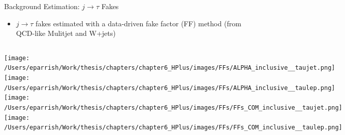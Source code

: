 \documentclass[aspectratio=169,xcolor=table]{beamer}
\begin{document}
\begin{frame}[t]{Background Estimation: $j \rightarrow \tau$ Fakes}
    \begin{itemize}
      \item $j \rightarrow \tau$ fakes estimated with a data-driven fake factor (FF) method (from QCD-like Mulitjet and W+jets)
      \begin{itemize}
      \end{itemize}
    \end{itemize}

    \begin{columns}
      \centering
        \texttt{[image: /Users/eparrish/Work/thesis/chapters/chapter6\_HPlus/images/FFs/ALPHA\_inclusive\_\_taujet.png]}
      \centering
        \texttt{[image: /Users/eparrish/Work/thesis/chapters/chapter6\_HPlus/images/FFs/ALPHA\_inclusive\_\_taulep.png]}
      \centering
        \texttt{[image: /Users/eparrish/Work/thesis/chapters/chapter6\_HPlus/images/FFs/FFs\_COM\_inclusive\_\_taujet.png]}
      \centering
        \texttt{[image: /Users/eparrish/Work/thesis/chapters/chapter6\_HPlus/images/FFs/FFs\_COM\_inclusive\_\_taulep.png]}
    \end{columns}
  \end{frame}
\end{document}
